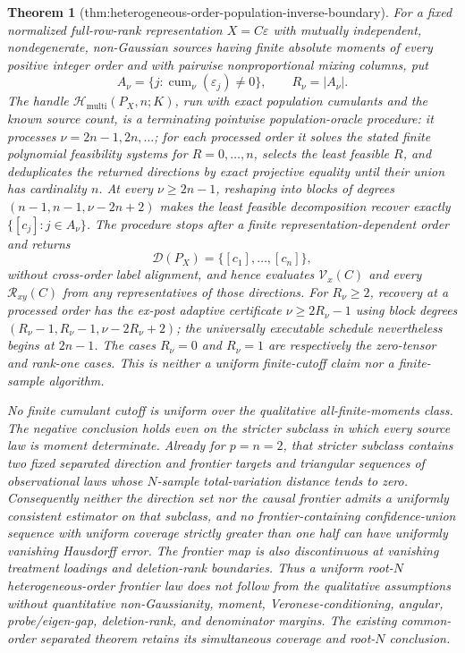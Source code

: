 \documentclass{article}
\newtheorem{theorem}{Theorem}
\begin{document}
\begin{theorem}[thm:heterogeneous-order-population-inverse-boundary]\label{thm:heterogeneous-order-population-inverse-boundary}
For a fixed normalized full-row-rank representation \(X=C\varepsilon\) with mutually independent, nondegenerate, non-Gaussian sources having finite absolute moments of every positive integer order and with pairwise nonproportional mixing columns, put
\[
 A_\nu=\{j:\operatorname{cum}_\nu(\varepsilon_j)\ne0\},
 \qquad R_\nu=|A_\nu|.
\]
The handle \(\mathcal H_{\mathrm{multi}}(P_X,n;K)\), run with exact population cumulants and the known source count, is a terminating pointwise population-oracle procedure: it processes \(\nu=2n-1,2n,\ldots\); for each processed order it solves the stated finite polynomial feasibility systems for \(R=0,\ldots,n\), selects the least feasible \(R\), and deduplicates the returned directions by exact projective equality until their union has cardinality \(n\). At every \(\nu\ge2n-1\), reshaping into blocks of degrees \((n-1,n-1,\nu-2n+2)\) makes the least feasible decomposition recover exactly \(\{[c_j]:j\in A_\nu\}\). The procedure stops after a finite representation-dependent order and returns
\[
 \mathcal D(P_X)=\{[c_1],\ldots,[c_n]\},
\]
without cross-order label alignment, and hence evaluates \(\mathcal V_x(C)\) and every \(\mathcal R_{xy}(C)\) from any representatives of those directions. For \(R_\nu\ge2\), recovery at a processed order has the ex-post adaptive certificate \(\nu\ge2R_\nu-1\) using block degrees \((R_\nu-1,R_\nu-1,\nu-2R_\nu+2)\); the universally executable schedule nevertheless begins at \(2n-1\). The cases \(R_\nu=0\) and \(R_\nu=1\) are respectively the zero-tensor and rank-one cases. This is neither a uniform finite-cutoff claim nor a finite-sample algorithm.

No finite cumulant cutoff is uniform over the qualitative all-finite-moments class. The negative conclusion holds even on the stricter subclass in which every source law is moment determinate. Already for \(p=n=2\), that stricter subclass contains two fixed separated direction and frontier targets and triangular sequences of observational laws whose \(N\)-sample total-variation distance tends to zero. Consequently neither the direction set nor the causal frontier admits a uniformly consistent estimator on that subclass, and no frontier-containing confidence-union sequence with uniform coverage strictly greater than one half can have uniformly vanishing Hausdorff error. The frontier map is also discontinuous at vanishing treatment loadings and deletion-rank boundaries. Thus a uniform root-\(N\) heterogeneous-order frontier law does not follow from the qualitative assumptions without quantitative non-Gaussianity, moment, Veronese-conditioning, angular, probe/eigen-gap, deletion-rank, and denominator margins. The existing common-order separated theorem retains its simultaneous coverage and root-\(N\) conclusion.
\end{theorem}
\end{document}
